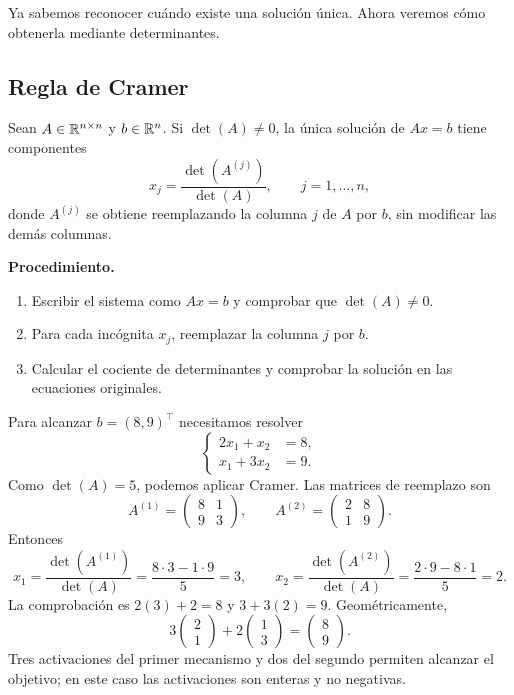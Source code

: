 \documentclass[compacto,10pt]{pubciencias-notas}
\begin{document}
Ya sabemos reconocer cuándo existe una solución única. Ahora veremos cómo
obtenerla mediante determinantes.

\subsection{Regla de Cramer}

\begin{teo}\label{sem05cl01:cramer}
    Sean $A\in\Mat[\R]{n}{n}$ y $b\in\R^n$. Si $\det(A)\ne0$, la única
    solución de $Ax=b$ tiene componentes
    \[
        x_j=\frac{\det(A^{(j)})}{\det(A)},\qquad j=1,\ldots,n,
    \]
    donde $A^{(j)}$ se obtiene reemplazando la columna $j$ de $A$ por $b$,
    sin modificar las demás columnas.
\end{teo}

\noindent\textbf{Procedimiento.}
\begin{enumerate}
    \item Escribir el sistema como $Ax=b$ y comprobar que $\det(A)\ne0$.
    \item Para cada incógnita $x_j$, reemplazar la columna $j$ por $b$.
    \item Calcular el cociente de determinantes y comprobar la solución
          en las ecuaciones originales.
\end{enumerate}

\begin{ejem}\label{sem05cl01:robot}
    Para alcanzar $b=(8,9)^{\top}$ necesitamos resolver
    \[
        \left\{\begin{aligned}2x_1+x_2&=8,\\x_1+3x_2&=9.\end{aligned}\right.
    \]
    Como $\det(A)=5$, podemos aplicar Cramer. Las matrices de reemplazo son
    \[
        A^{(1)}=\begin{pmatrix}8&1\\9&3\end{pmatrix},
        \qquad A^{(2)}=\begin{pmatrix}2&8\\1&9\end{pmatrix}.
    \]
    Entonces
    \[
        x_1=\frac{\det(A^{(1)})}{\det(A)}=\frac{8\cdot3-1\cdot9}{5}=3,
        \qquad x_2=\frac{\det(A^{(2)})}{\det(A)}=\frac{2\cdot9-8\cdot1}{5}=2.
    \]
    La comprobación es $2(3)+2=8$ y $3+3(2)=9$. Geométricamente,
    \[
        3\begin{pmatrix}2\\1\end{pmatrix}
        +2\begin{pmatrix}1\\3\end{pmatrix}
        =\begin{pmatrix}8\\9\end{pmatrix}.
    \]
    Tres activaciones del primer mecanismo y dos del segundo permiten
    alcanzar el objetivo; en este caso las activaciones son enteras y no negativas.
\end{ejem}
\end{document}
